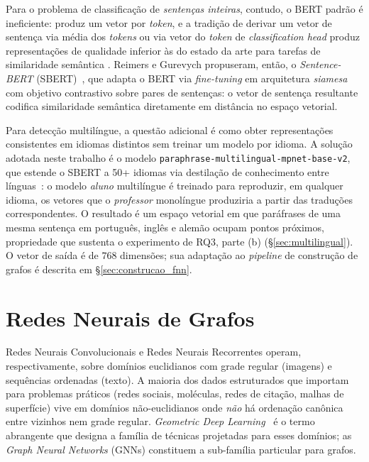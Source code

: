 Para o problema de classifica\c{c}\~ao de \emph{senten\c{c}as inteiras},
contudo, o BERT padr\~ao \'e ineficiente: produz um vetor por
\emph{token}, e a tradi\c{c}\~ao de derivar um vetor de senten\c{c}a
via m\'edia dos \emph{tokens} ou via vetor do \emph{token} de
\emph{classification head} produz representa\c{c}\~oes de qualidade
inferior \`as do estado da arte para tarefas de similaridade sem\^antica
\cite{reimers2019sbert}. Reimers e Gurevych propuseram, ent\~ao, o
\emph{Sentence-BERT} (SBERT)~\cite{reimers2019sbert}, que adapta o BERT
via \emph{fine-tuning} em arquitetura \emph{siamesa} com objetivo
contrastivo sobre pares de senten\c{c}as: o vetor de senten\c{c}a
resultante codifica similaridade sem\^antica diretamente em dist\^ancia
no espa\c{c}o vetorial.

Para detec\c{c}\~ao multil\'ingue, a quest\~ao adicional \'e como obter
representa\c{c}\~oes consistentes em idiomas distintos sem treinar
um modelo por idioma. A solu\c{c}\~ao adotada neste trabalho \'e o
modelo \texttt{paraphrase-multilingual-mpnet-base-v2}, que estende o
SBERT a 50+ idiomas via destila\c{c}\~ao de conhecimento entre
l\'inguas~\cite{reimers2020multilingual}: o modelo \emph{aluno}
multil\'ingue \'e treinado para reproduzir, em qualquer idioma, os
vetores que o \emph{professor} monol\'ingue produziria a partir das
tradu\c{c}\~oes correspondentes. O resultado \'e um espa\c{c}o vetorial
em que par\'afrases de uma mesma senten\c{c}a em portugu\^es, ingl\^es
e alem\~ao ocupam pontos pr\'oximos, propriedade que sustenta o
experimento de RQ3, parte (b) (\S\ref{sec:multilingual}). O vetor de
sa\'ida \'e de $768$ dimens\~oes; sua adapta\c{c}\~ao ao
\emph{pipeline} de constru\c{c}\~ao de grafos \'e descrita em
\S\ref{sec:construcao_fnn}.

\section{Redes Neurais de Grafos}
\label{sec:gnns}

Redes Neurais Convolucionais e Redes Neurais Recorrentes operam,
respectivamente, sobre dom\'inios euclidianos com grade regular
(imagens) e sequ\^encias ordenadas (texto). A maioria dos dados
estruturados que importam para problemas pr\'aticos (redes sociais,
mol\'eculas, redes de cita\c{c}\~ao, malhas de superf\'icie) vive em
dom\'inios n\~ao-euclidianos onde \emph{n\~ao} h\'a ordena\c{c}\~ao
can\^onica entre vizinhos nem grade regular. \emph{Geometric Deep
Learning}~\cite{bronstein2017geometric} \'e o termo abrangente que
designa a fam\'ilia de t\'ecnicas projetadas para esses dom\'inios; as
\emph{Graph Neural Networks} (GNNs) constituem a sub-fam\'ilia
particular para grafos.

